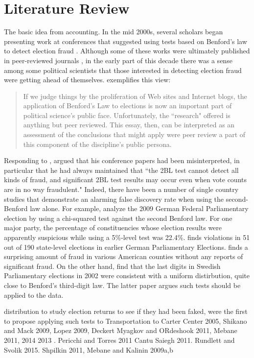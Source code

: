 \section{Literature Review}

The basic idea from accounting. In the mid 2000s, several scholars began presenting work at conferences that suggested using tests based on Benford's law to detect election fraud \parencite{Mebane2006,Pericchi2004}.  Although some of these works were ultimately published in peer-reviewed journals \parencite{Pericchi2011}, in the early part of this decade there was a sense among some political scientists that those interested in detecting election fraud were getting ahead of themselves.  \textcite{Deckert2011} exemplifies this view:

\begin{quote}
If we judge things by the proliferation of Web sites and Internet blogs, the application of Benford’s Law to elections is now an important part of political science’s public face. Unfortunately, the ``research" offered is anything but peer reviewed. This essay, then, can be interpreted as an assessment of the conclusions that might apply were peer review a part of this component of the discipline’s public persona.
\end{quote}

Responding to \textcite{Deckert2011}, \textcite{Mebane2011} argued that his conference papers had been misinterpreted, in particular that he had always maintained that ``the 2BL test cannot detect all kinds of fraud, and significant
2BL test results may occur even when vote counts are in no way fraudulent."  Indeed, there have been a number of single country studies that demonstrate an alarming false discovery rate when using the second-Benford law alone. For example, \textcite{Shikano2011} analyze the 2009 German Federal Parliamentary election by using a chi-squared test against the second Benford law. For one major party, the percentage of constituencies whose election results were apparently suspicious while using a 5\%-level test was 22.4\%. \textcite{Breunig2011} finds violations in 51 out of 190 state-level elections in earlier German Parliamentary Elections. \textcite{Mebane2008} finds a surprising amount of fraud in various American counties without any reports of significant fraud.  On the other hand, \textcite{Beber2012} find that the last digits in Swedish Parliamentary elections in 2002 were consistent with a uniform distirbution, quite close to Benford's third-digit law. The latter paper argues such tests should be applied to the data.




 distribution to study election returns to see if they had been faked, were the first to propose applying such tests to   Transportation to Carter Center 2005, Shikano and Mack 2009, Lopez 2009, Deckert Myagkov and ORdeshook 2011, Mebane 2011, 2014 2013 .  Pericchi and Torres 2011 Cantu Saiegh 2011. Rundlett and Svolik 2015. Shpilkin 2011, Mebane and Kalinin 2009a,b